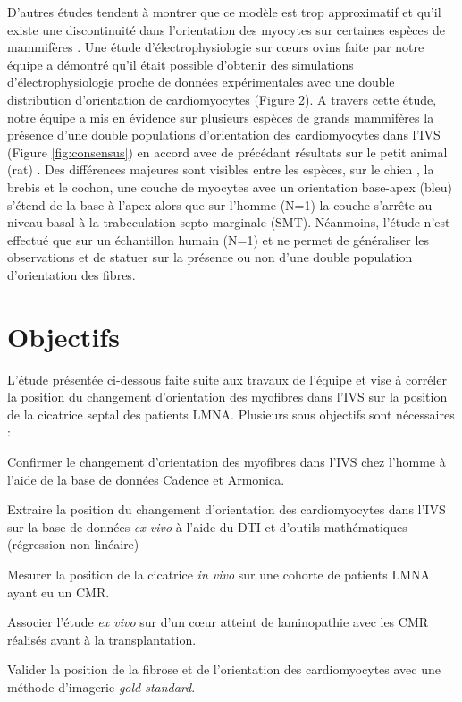 D’autres études tendent à montrer que ce modèle est trop approximatif et qu’il existe une discontinuité dans l’orientation des myocytes sur certaines espèces de mammifères \cite{Doste2019} \cite{Teh2016}. Une étude d’électrophysiologie \cite{RodrguezPadilla2022} sur cœurs ovins faite par notre équipe a démontré qu’il était possible d’obtenir des simulations d’électrophysiologie proche de données expérimentales \cite{Vetter2005} avec une double distribution d’orientation de cardiomyocytes (Figure 2). A travers cette étude, notre équipe a mis en évidence sur plusieurs espèces de grands mammifères la présence d’une double populations d’orientation des cardiomyocytes dans l’IVS (Figure \ref{fig:consensus}) en accord avec de précédant résultats sur le petit animal (rat) \cite{Teh2016}. Des différences majeures sont visibles entre les espèces, sur le chien , la brebis et le cochon, une couche de myocytes avec un orientation base-apex (bleu) s’étend de la base à l’apex alors que sur l’homme (N=1) la couche s’arrête au niveau basal à la trabeculation septo-marginale (SMT).  Néanmoins, l’étude n’est effectué que sur un échantillon humain (N=1) et ne permet de généraliser les observations et de statuer sur la présence ou non d’une double population d’orientation des fibres.
\\
\section{Objectifs}

L’étude présentée ci-dessous faite suite aux travaux de l’équipe \cite{RodrguezPadilla2022} et vise à corréler la position du changement d’orientation des myofibres dans l’IVS sur la position de la cicatrice septal des patients LMNA. Plusieurs sous objectifs sont nécessaires :

\begin{bulletList}
 \item Confirmer le changement d’orientation des myofibres dans l’IVS chez l’homme à l’aide de la base de données Cadence et Armonica. 
 \item Extraire la position du changement d’orientation des cardiomyocytes dans l’IVS sur la base de données \textit{ex vivo} à l’aide du DTI et d’outils mathématiques (régression non linéaire)
 \item Mesurer la position de la cicatrice \textit{in vivo} sur une cohorte de patients LMNA ayant eu un CMR.
 \item Associer l’étude \textit{ex vivo}  sur d’un cœur atteint de laminopathie avec les CMR réalisés avant à la transplantation. 
 \item Valider la position de la fibrose et de l’orientation des cardiomyocytes avec une méthode d’imagerie \textit{gold standard}.
\end{bulletList}




